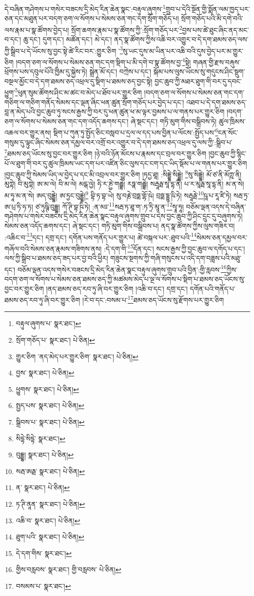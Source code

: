 དེ་བཞིན་གཤེགས་པ་གསེར་བཟངས་དྲི་མེད་རིན་ཆེན་སྣང་:བརྟུལ་ཞུགས་\footnote{བརྟུལ་ཞུགས་པ་  སྣར་ཐང་། }གྲུབ་པ་དེའི་སྔོན་གྱི་སྨོན་ལམ་ཁྱད་པར་ཅན་དང་མཐུན་པར་བདག་ཅག་ལ་སོགས་པ་སེམས་ཅན་གང་དག་སྲོག་གཅོད་པ། སྲོག་གཅོད་པའི་མི་དགེ་བའི་ལས་རྣམ་པ་སྣ་ཚོགས་བྱེད་པ། སྲོག་ཆགས་རྣམ་པ་སྣ་ཚོགས་ཀྱི་:སྲོག་གཅོད་པར་\footnote{སྲོག་གཅོད་པ་  སྣར་ཐང་།  པེ་ཅིན། }བྱས་པས་ཚེ་ཐུང་ཞིང་ནད་མང་བ་དང་། ཆུ་དང་། དུག་དང་། མཚོན་དང་། མེ་དང་། ནད་སྣ་ཚོགས་ཀྱིས་འཆི་བར་འགྱུར་བ་དེ་དག་ཐམས་ཅད་ལས་ཀྱི་སྒྲིབ་པ་དེ་ཡོངས་སུ་བྱང་སྟེ་ཚེ་རིང་བར་:གྱུར་ཅིག ་\footnote{གྱུར་ཅིག ་ནད་མེད་པར་གྱུར་ཅིག་  སྣར་ཐང་།  པེ་ཅིན། }སུ་ཡང་དུས་མ་ཡིན་པར་འཆི་བའི་དུས་བྱེད་པར་མ་གྱུར་ཅིག །བདག་ཅག་ལ་སོགས་པ་སེམས་ཅན་གང་དག་སྡིག་པ་མི་དགེ་བ་སྣ་ཚོགས་བྱ་\footnote{བྱས་  སྣར་ཐང་།  པེ་ཅིན། }སྟེ། གཞན་གྱི་རྫས་བརྐུས་ཕྲོགས་པས་དབུལ་པོའི་ཁྱིམ་དུ་སྐྱེས་ཏེ། སྒྲེན་མོ་དང་། བཀྲེས་པ་དང་། སྐོམ་པས་ལུས་ཡོངས་སུ་གདུངས་ཤིང་སྡུག་བསྔལ་མྱོང་བ་དེ་དག་ཐམས་ཅད་འཕྲལ་དུ་སྡིག་པ་ཐམས་ཅད་བྱང་སྟེ། བྱང་ཆུབ་ཀྱི་མཐར་ཐུག་གི་བར་དུ་དབང་ཕྱུག་\footnote{ཕྱུགས་  སྣར་ཐང་།  པེ་ཅིན། }ཕུན་སུམ་ཚོགས་ཤིང་མ་ཚང་བ་མེད་པ་ཐོབ་པར་གྱུར་ཅིག །བདག་ཅག་ལ་སོགས་པ་སེམས་ཅན་གང་དག་གཅིག་ལ་གཅིག་གནོད་སེམས་དང་ལྡན་ཞིང་ཕན་ཚུན་སྲོག་གཅོད་པར་བྱེད་པ་དང་། འཐབ་པ་དེ་དག་ཐམས་ཅད་བླ་ན་མེད་པའི་བྱང་ཆུབ་ཏུ་སངས་རྒྱས་ཀྱི་བར་དུ་ཕན་ཚུན་ཕ་མ་ལྟར་བྱམས་པ་ལ་གནས་པར་གྱུར་ཅིག །བདག་ཅག་ལ་སོགས་པ་སེམས་ཅན་གང་དག་འདོད་ཆགས་དང་། ཞེ་སྡང་དང་། གཏི་མུག་གིས་བསྒྲིབས་ཏེ། ཚུལ་ཁྲིམས་འཆལ་བར་གྱུར་ནས། སྡིག་པ་ཀུན་ཏུ་སྤྱོད་ཅིང་བསླབ་པ་དྲལ་ལ་དད་པས་བྱིན་པ་ལོངས་:སྤྱོད་པས་\footnote{སྤྱད་པས་  སྣར་ཐང་།  པེ་ཅིན། }ངན་སོང་གསུམ་དུ་ལྟུང་ཞིང་སེམས་ཅན་དམྱལ་བར་འགྲོ་བར་འགྱུར་བ་དེ་དག་ཐམས་ཅད་འཕྲལ་དུ་ལས་ཀྱི་:སྒྲིབ་པ་\footnote{སྒྲིབས་པ་  སྣར་ཐང་།  པེ་ཅིན། }ཐམས་ཅད་ཡོངས་སུ་བྱང་བར་གྱུར་ཅིག །ཉེ་བའི་ཉོན་མོངས་པ་རྣམས་དང་བྲལ་བར་གྱུར་ཅིག །བྱང་ཆུབ་ཀྱི་སྙིང་པོ་ལ་ཐུག་གི་བར་དུ་ཚུལ་ཁྲིམས་ཡང་དག་པར་འཛིན་ཅིང་ལུས་དང་ངག་དང་ཡིད་སྡོམ་པ་ལ་གནས་པར་གྱུར་ཅིག །བྱང་ཆུབ་ཀྱི་སེམས་ཡིད་ལ་བྱེད་པ་དང་མི་འབྲལ་བར་གྱུར་ཅིག །ཏདྱ་ཐཱ། :སིདྡྷེ་སིདྡྷེ། \footnote{སིདྷེ་སིདྷེ་  སྣར་ཐང་། }སུ་སིདྡྷེ། མོ་ཙ་ནི་མོཀྵ་ནི། མུཀྟེ། བི་མུཀྟེ། ཨ་མ་ལེ། བི་མ་ལེ། མངྒ་ལྱེ། ཧི་ར་ཎྱེ་གརྦྷེ། རཏྣ་གརྦྷེ། སརྦཱརྠ་སཱ་དྷ་ནི། པ་ར་མཱརྠ་སཱ་དྷ་ནི། མ་ན་སེ། མ་ཧཱ་མ་ན་སེ། ཨད་བུདྡྷེ། ཨ་ཏྱང་བུདྡྷེ།\footnote{བུདྡྷ།  སྣར་ཐང་།  པེ་ཅིན། } བྷི་ཏ་བྷ་ཡེ། སུ་བརྞེ་བྲཧྨ་གྷོ་ཥེ། བྲཧྨ་དྷྱུ་ཥི་ཏེ། སརྦཱརྠེ་\footnote{སརྦ་ཨརྠ་  སྣར་ཐང་།  པེ་ཅིན། }ཥཱ་པ་རཱ་ཛི་ཏེ། སརྦ་ཏྲ་ཨ་པྲ་ཏི་ཧ་ཏ། ཙ་ཏུཥྚི་བུདྡྷ། ཀོ་ཊི་བྷ་ཥི་ཏེ། :ན་མཿ་\footnote{ན་  སྣར་ཐང་།  པེ་ཅིན། }སརྦ་ཏ་ཐཱ་ག་:ཏ་ཏྲི་མཱ་ན་\footnote{ཏ་ཊི་ནཱན་  སྣར་ཐང་།  པེ་ཅིན། }སྭཱ་ཧཱ། བཅོམ་ལྡན་འདས་དེ་བཞིན་གཤེགས་པ་གསེར་བཟངས་དྲི་མེད་རིན་ཆེན་སྣང་བརྟུལ་ཞུགས་གྲུབ་པ་དེས་བྱང་ཆུབ་ཀྱི་ཤིང་དྲུང་དུ་བཞུགས་ཏེ། སེམས་ཅན་འདོད་ཆགས་དང་། ཞེ་སྡང་དང་། གཏི་མུག་གིས་བསྒྲིབས་པ། ནད་སྣ་ཚོགས་ཀྱིས་ལུས་གཟིར་བ། :འཆིང་བ་\footnote{འཆི་བ་  སྣར་ཐང་།  པེ་ཅིན། }དང་། དགྲ་དང་། དགོན་པས་གནོད་པར་གྱུར་པ། ཚེ་བསྐལ་པར་:ཐུབ་པའི་\footnote{ཐུག་པའི་  སྣར་ཐང་།  པེ་ཅིན། }སེམས་ཅན་དམྱལ་བར་གཞོལ་བའི་སེམས་ཅན་རྣམས་གཟིགས་ནས། :དེ་དག་གི་\footnote{དེ་དག་གིས་  སྣར་ཐང་། }དོན་དང་། སངས་རྒྱས་ཀྱི་བྱང་ཆུབ་ལ་དགོད་པ་དང་། ལས་ཀྱི་སྒྲིབ་པ་ཐམས་ཅད་ཟད་པར་བྱ་བའི་ཕྱིར། གཟུངས་སྔགས་ཀྱི་གཞི་གསུངས་པ་འདི་དག་བཟླས་པའི་མཐུ་དང་། བཅོམ་ལྡན་འདས་གསེར་བཟངས་དྲི་མེད་རིན་ཆེན་སྣང་བརྟུལ་ཞུགས་གྲུབ་པའི་བྱིན་:གྱི་རླབས་\footnote{གྱིས་བརླབས་  སྣར་ཐང་། གྱི་བརླབས་  པེ་ཅིན། }ཀྱིས་བདག་ཅག་ལ་སོགས་པ་སེམས་ཅན་ཐམས་ཅད་ཀྱི་མཚམས་མེད་པ་ལྔ་ལ་སོགས་པ་སྡིག་པ་ཐམས་ཅད་ཡོངས་སུ་བྱང་བར་གྱུར་ཅིག །ནད་ཐམས་ཅད་རབ་ཏུ་ཞི་བར་གྱུར་ཅིག །འཆི་བ་དང་། དགྲ་དང་། དགོན་པའི་གནོད་པ་ཐམས་ཅད་རབ་ཏུ་ཞི་བར་གྱུར་ཅིག །རེ་བ་དང་:བསམ་པ་\footnote{བསམས་པ་  སྣར་ཐང་། }ཐམས་ཅད་ཡོངས་སུ་རྫོགས་པར་གྱུར་ཅིག 